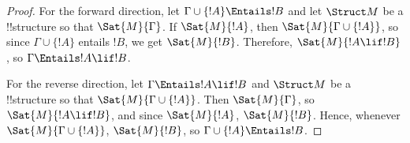 \documentclass[../../include/open-logic-section]{subfiles}
\begin{document}
\begin{proof}
For the forward direction, let $\Gamma \cup \{ !A \} \Entails !B$ and
let $\Struct M$ be a !!{structure} so that $\Sat{M}{\Gamma}$. If
$\Sat{M}{!A}$, then $\Sat{M}{\Gamma \cup \{ !A \} }$, so since $\Gamma
\cup \{ !A \}$ entails $!B$, we get $\Sat{M}{!B}$. Therefore,
$\Sat{M}{!A \lif !B}$, so $\Gamma \Entails !A \lif !B$.

For the reverse direction, let $\Gamma \Entails !A \lif !B$ and
$\Struct M$ be a !!{structure} so that $\Sat{M}{\Gamma \cup \{ !A
  \}}$. Then $\Sat{M}{\Gamma}$, so $\Sat{M}{!A \lif !B}$, and since
$\Sat{M}{!A}$, $\Sat{M}{!B}$. Hence, whenever $\Sat{M}{\Gamma \cup \{
  !A \} }$, $\Sat{M}{!B}$, so $\Gamma \cup \{ !A \} \Entails !B$.
\end{proof}
\end{document}
